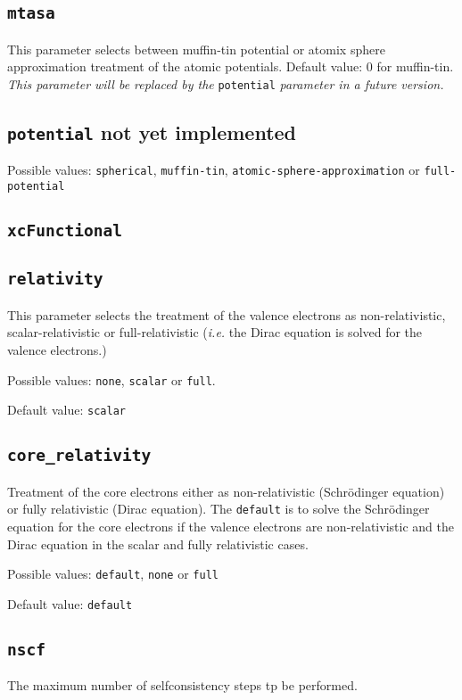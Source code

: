 \subsection{\texttt{mtasa}}
This parameter selects between muffin-tin potential or atomix sphere
approximation treatment of the atomic potentials. Default value: 0 for
muffin-tin. \textit{This parameter will be replaced by the}
\texttt{potential} \textit{parameter in a future version.}

\subsection{\texttt{potential} not yet implemented}
Possible values: \texttt{spherical}, \texttt{muffin-tin},
\texttt{atomic-sphere-approximation} or \texttt{full-potential}

\subsection{\texttt{xcFunctional}}

\subsection{\texttt{relativity}}
This parameter selects the treatment of the valence electrons as non-relativistic, scalar-relativistic
or full-relativistic (\textit{i.e.} the Dirac equation is solved for the valence electrons.)

Possible values: \texttt{none}, \texttt{scalar} or \texttt{full}.

Default value: \texttt{scalar} 

\subsection{\texttt{core\_relativity}}
Treatment of the core electrons either as non-relativistic (Schr\"odinger equation)
or fully relativistic (Dirac equation).
The \texttt{default} is to solve the Schr\"odinger equation for the core electrons if the valence
electrons are non-relativistic and the Dirac equation in the scalar and fully relativistic cases.
 
Possible values: \texttt{default}, \texttt{none} or \texttt{full}

Default value: \texttt{default}

\subsection{\texttt{nscf}}
The maximum number of selfconsistency steps tp be performed.

